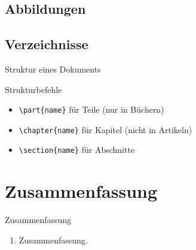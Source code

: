 \subsection{Abbildungen}


\subsection{Verzeichnisse}

\begin{Frame}[fragile]{Struktur eines Dokuments}
  \begin{Block}{Strukturbefehle}
    \begin{itemize}
      \item \lstinline-\part{name}- für Teile (nur in Büchern)
      \item \lstinline-\chapter{name}- für Kapitel (nicht in Artikeln)
      \item \lstinline-\section{name}- für Abschnitte
    \end{itemize}
  \end{Block}
\end{Frame}


\section*{Zusammenfassung}

\begin{frame}{Zusammenfassung}
  \begin{enumerate}
    \item Zusammenfassung.
  \end{enumerate}
\end{frame}